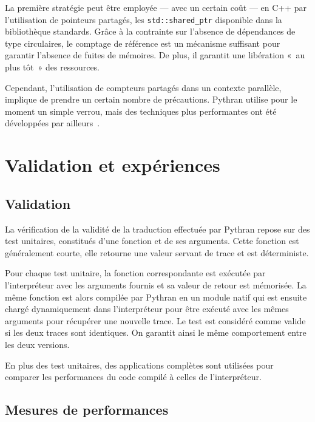 \documentclass[renpar]{compas2013}
\begin{document}
La première stratégie peut être employée --- avec un certain coût --- en
C++ par l'utilisation de pointeurs partagés, les \texttt{std::shared\_ptr}
disponible dans la bibliothèque standards.  Grâce à la contrainte sur
l'absence de dépendances de type circulaires, le comptage de référence est
un mécanisme suffisant pour garantir l'absence de fuites de mémoires. De
plus, il garantit une libération «~au plus tôt~» des ressources.

Cependant, l'utilisation de compteurs partagés dans un contexte parallèle,
implique de prendre un certain nombre de précautions. Pythran utilise pour
le moment un simple verrou, mais des techniques plus performantes ont été
développées par ailleurs~\cite{Levanoni2006}.

\section{Validation et expériences}\label{sec:validation}

\subsection{Validation}

La vérification de la validité de la traduction effectuée par Pythran
repose sur des test unitaires, constitués d'une fonction et de ses
arguments.  Cette fonction est généralement courte, elle retourne une
valeur servant de trace et est déterministe.

Pour chaque test unitaire, la fonction correspondante est exécutée par
l'interpréteur avec les arguments fournis et sa valeur de retour est
mémorisée. La même fonction est alors compilée par Pythran en un module
natif qui est ensuite chargé dynamiquement dans l'interpréteur pour être
exécuté avec les mêmes arguments pour récupérer une nouvelle trace. Le
test est considéré comme valide si les deux traces sont identiques. On
garantit ainsi le même comportement entre les deux versions.

En plus des test unitaires, des applications complètes sont utilisées pour
comparer les performances du code compilé à celles de l'interpréteur.

\subsection{Mesures de performances}
\end{document}
